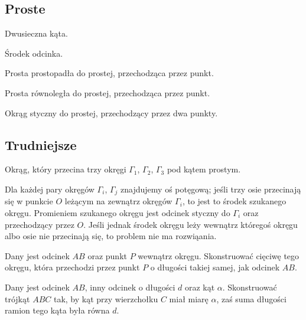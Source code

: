 \subsection{Proste}
\begin{problem}
    Dwusieczna kąta.
\end{problem}

\begin{problem}
    Środek odcinka.
\end{problem}

\begin{problem}
    Prosta prostopadła do prostej, przechodząca przez punkt.
\end{problem}

\begin{problem}
    Prosta równoległa do prostej, przechodząca przez punkt.
\end{problem}

\begin{problem}
    Okrąg styczny do prostej, przechodzący przez dwa punkty.
\end{problem}



\subsection{Trudniejsze}

\begin{problem}[Monge'a?]
    Okrąg, który przecina trzy okręgi $\Gamma_1$, $\Gamma_2$, $\Gamma_3$ pod kątem prostym.
\end{problem}

Dla każdej pary okręgów $\Gamma_i$, $\Gamma_j$ znajdujemy oś potęgową; jeśli trzy osie przecinają się w punkcie $O$ leżącym na zewnątrz okręgów $\Gamma_i$, to jest to środek szukanego okręgu.
Promieniem szukanego okręgu jest odcinek styczny do $\Gamma_i$ oraz przechodzący przez $O$.
Jeśli jednak środek okręgu leży wewnątrz któregoś okręgu albo osie nie przecinają się, to problem nie ma rozwiąania.

\begin{problem}
    Dany jest odcinek $AB$ oraz punkt $P$ wewnątrz okręgu.
    Skonstruować cięciwę tego okręgu, która przechodzi przez punkt $P$ o długości takiej samej, jak odcinek $AB$.
\end{problem}

\begin{problem}
    Dany jest odcinek $AB$, inny odcinek o długości $d$ oraz kąt $\alpha$.
    Skonstruować trójkąt $ABC$ tak, by kąt przy wierzchołku $C$ miał miarę $\alpha$, zaś suma długości ramion tego kąta była równa $d$.
\end{problem}

